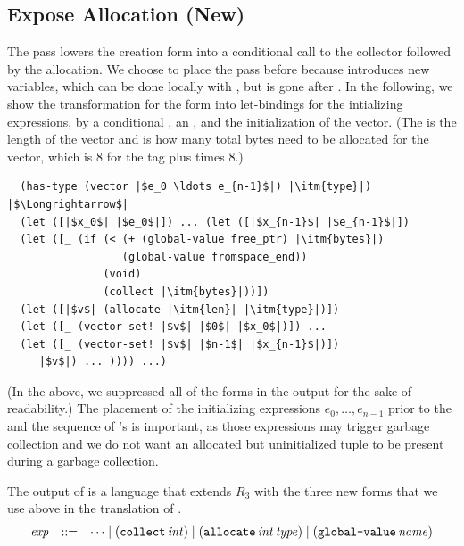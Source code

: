 \documentclass[11pt]{book}
\begin{document}
\subsection{Expose Allocation (New)}
\label{sec:expose-allocation}

The pass  lowers the  creation
form into a conditional call to the collector followed by the
allocation. We choose to place the  pass
before  because  introduces new
variables, which can be done locally with , but 
is gone after .  In the following, we show the
transformation for the  form into let-bindings for the
intializing expressions, by a conditional , an
, and the initialization of the vector.
(The  is the length of the vector and  is how many
total bytes need to be allocated for the vector, which is 8 for the
tag plus  times 8.)

\begin{lstlisting}
  (has-type (vector |$e_0 \ldots e_{n-1}$|) |\itm{type}|)
|$\Longrightarrow$|
  (let ([|$x_0$| |$e_0$|]) ... (let ([|$x_{n-1}$| |$e_{n-1}$|])
  (let ([_ (if (< (+ (global-value free_ptr) |\itm{bytes}|)
                  (global-value fromspace_end))
               (void)
               (collect |\itm{bytes}|))])
  (let ([|$v$| (allocate |\itm{len}| |\itm{type}|)])
  (let ([_ (vector-set! |$v$| |$0$| |$x_0$|)]) ...
  (let ([_ (vector-set! |$v$| |$n-1$| |$x_{n-1}$|)])
     |$v$|) ... )))) ...)
\end{lstlisting}
(In the above, we suppressed all of the  forms in the
output for the sake of readability.)  The placement of the initializing
expressions $e_0,\ldots,e_{n-1}$ prior to the  and
the sequence of 's is important, as those expressions
may trigger garbage collection and we do not want an allocated but
uninitialized tuple to be present during a garbage collection.

The output of  is a language that extends
$R_3$ with the three new forms that we use above in the translation of
.
\[
\begin{array}{lcl}
  \mathit{exp} &::=& \cdots
      \mid (\texttt{collect} \,\mathit{int})
      \mid (\texttt{allocate} \,\mathit{int}\,\mathit{type})
      \mid (\texttt{global-value} \,\mathit{name})
\end{array}
\]

%
\end{document}

